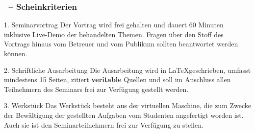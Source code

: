 \documentclass[utf8]{beamer}
\begin{document}
\begin{frame}
  \frametitle{\insertsectionhead\ -- Scheinkriterien}
  
  \begin{block}{1. Seminarvortrag}
  Der Vortrag wird frei gehalten und dauert 60 Minuten inklusive Live-Demo der behandelten Themen. Fragen über den Stoff des Vortrags hinaus vom Betreuer und vom Publikum sollten beantwortet werden können.
  \end{block}
  
  \begin{block}{2. Schriftliche Ausarbeitung}
  Die Ausarbeitung wird in \LaTeX geschrieben, umfasst mindestens 15 Seiten, zitiert {\bf veritable} Quellen und soll im Anschluss allen Teilnehmern des Seminars frei zur Verfügung gestellt werden.
  \end{block}
  
 
 \begin{block}{3. Werkstück}
 Das Werkstück besteht aus der virtuellen Maschine, die zum Zwecke der Bewältigung der gestellten Aufgaben vom Studenten angefertigt worden ist. Auch sie ist den Seminarteilnehmern frei zur Verfügung zu stellen.
 \end{block}
 
\end{frame}
 
\end{document}
